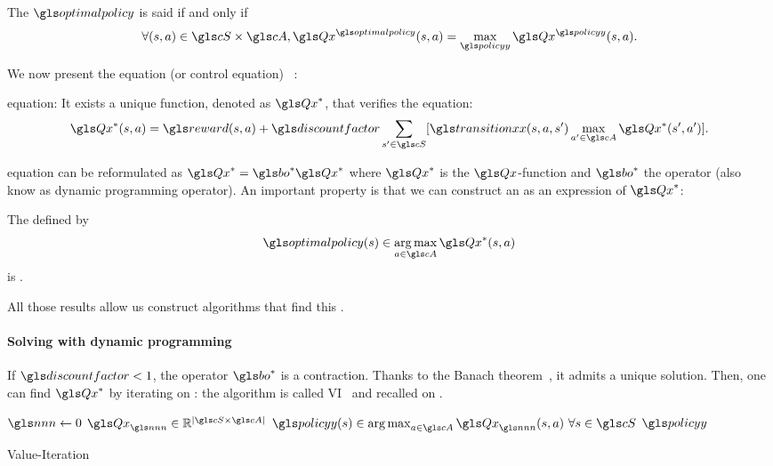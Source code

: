 \begin{definition}
    The  $\optimalpolicy$ is said  if and only if
    \begin{align}
        \forall (s,a) \in \cS\times\cA,\Q^{\optimalpolicy} (s,a) = \max_{\policy}\Q^{\policy} (s,a).
    \end{align}
\end{definition}

We now present the  equation (or control equation) ~\parencite{Bellman}:
\begin{theorem}{ equation}:
    It exists a unique function, denoted as $\Q^*$, that verifies the  equation:
    \begin{align}
        \Q^*(s,a)=\reward(s,a) +\discountfactor \sum_{s'\in \cS}[\transition(s,a,s')\max_{a'\in \cA}\Q^*(s',a')].
        \label{eq:bellman-control}
    \end{align}
\end{theorem}

 equation can be reformulated as $\Q^*=\bo^{*} \Q^*$ where $\Q^*$ is the  $\Q$-function and $\bo^{*}$ the  operator (also know as dynamic programming operator). An important property is that we can construct an   as an expression of $\Q^*$:
\begin{proposition}
    The  defined by
    \begin{align}
        \optimalpolicy(s) \in \argmax\limits_{a\in \cA} \Q^*(s,a)
    \end{align} is .
\end{proposition}
All those results allow us construct algorithms that find this  .

\paragraph{Solving with dynamic programming}

If $\discountfactor < 1$, the operator $\bo^{*}$ is a contraction. Thanks to the Banach theorem~\parencite{Banach1922}, it admits a unique solution. Then, one can find $\Q^*$ by iterating on : the algorithm is called \gls{VI}~\parencite{bellman57} and recalled on .

\begin{algorithm}
    \DontPrintSemicolon
    $\n\leftarrow 0$\;
    $\Q_{\n}\in \mathbb{R}^{|\cS\times\cA|}$\;
    $\policy(s) \in \argmax_{a\in\cA} \Q_{\n}(s,a)\ \forall s\in\cS$\;
    \Return $\policy$\;
    \caption{Value-Iteration}
    \label{alg:value-iteration}
\end{algorithm}

